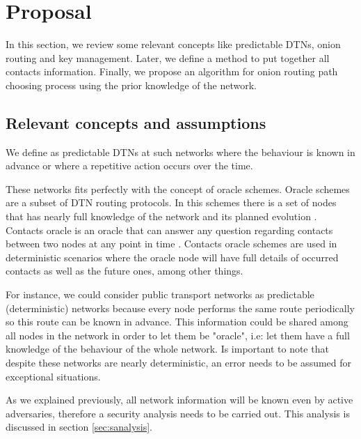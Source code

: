 \section{Proposal}\label{sec:proposal}



In this section, we review some relevant concepts like predictable DTNs, onion routing and key management. Later, we define a method to put together all contacts information. Finally, we propose an algorithm for onion routing path choosing process using the prior knowledge of the network.

\subsection{Relevant concepts and assumptions}

We define as predictable DTNs at such networks where the behaviour is known in advance or where a repetitive action occurs over the time.

These networks fits perfectly with the concept of oracle schemes. Oracle schemes are a subset of DTN routing protocols. In this schemes there is a set of nodes that has nearly full knowledge of the network and its planned evolution \cite{dtn-book}. Contacts oracle is an oracle that can answer any question regarding contacts between two nodes at any point in time \cite{oracle-types}. Contacts oracle schemes are used in deterministic scenarios where the oracle node will have full details of occurred contacts as well as the future ones, among other things.

For instance, we could consider public transport networks as predictable (deterministic) networks because every node performs the same route periodically so this route can be known in advance. This information could be shared among all nodes in the network in order to let them be "oracle", i.e: let them have a full knowledge of the behaviour of the whole network. Is important to note that despite these networks are nearly deterministic, an error needs to be assumed for exceptional situations.

As we explained previously, all network information will be known even by active adversaries, therefore a security analysis needs to be carried out. This analysis is discussed in section \ref{sec:sanalysis}.

